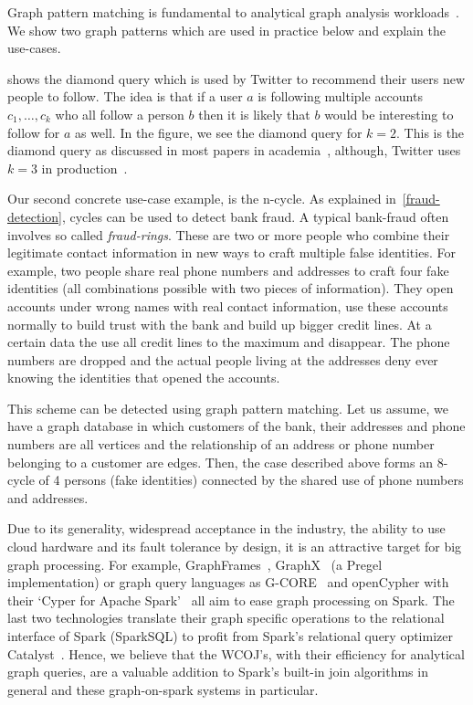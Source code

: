 Graph pattern matching is fundamental to analytical graph analysis workloads~\cite{see longbin and semih and presentation}.
We show two graph patterns which are used in practice below and explain the use-cases.

 shows the diamond query which is used by Twitter to recommend their users new people to follow.
The idea is that if a user $a$ is following multiple accounts $c_1, \dots, c_k$ who all follow a person $b$ then it is likely that
$b$ would be interesting to follow for $a$ as well.
In the figure, we see the diamond query for $k = 2$.
This is the diamond query as discussed in most papers in academia~\cite{oldog,myria-detailed,mhedhbi2019}, although,
Twitter uses $k = 3$ in production~\cite{twitter-diamond}.

Our second concrete use-case example, is the n-cycle.
As explained in~\cref{fraud-detection}, cycles can be used to detect bank fraud.
A typical bank-fraud often involves so called \textit{fraud-rings}.
These are two or more people who combine their legitimate contact information in new ways to craft multiple false identities.
For example, two people share real phone numbers and addresses to craft four fake identities (all combinations possible with two pieces
of information).
They open accounts under wrong names with real contact information, use these accounts normally to build trust with the bank and
build up bigger credit lines.
At a certain data the use all credit lines to the maximum and disappear.
The phone numbers are dropped and the actual people living at the addresses deny ever knowing the identities that opened the accounts.

This scheme can be detected using graph pattern matching.
Let us assume, we have a graph database in which customers of the bank, their addresses and phone numbers are all vertices and the
relationship of an address or phone number belonging to a customer are edges.
Then, the case described above forms an 8-cycle of 4 persons (fake identities) connected by the shared use of phone numbers and
addresses.

Due to its generality, widespread acceptance in the industry, the ability to use cloud hardware and its fault tolerance by design,
it is an attractive target for big graph processing.
For example, GraphFrames~\cite{graphframe}, GraphX~\cite{graphx} (a Pregel~\cite{pregel} implementation) or graph query languages
as \mbox{G-CORE}~\cite{gcore} and \mbox{openCypher} with their `Cyper for Apache Spark'~\cite{caps} all aim to ease graph processing on
Spark.
The last two technologies translate their graph specific operations to the relational interface of Spark (SparkSQL)
to profit from Spark's relational query optimizer Catalyst~\cite{spark-sql}.
Hence, we believe that the WCOJ's, with their efficiency for analytical graph queries, are a valuable addition to Spark's
built-in join algorithms in general and these graph-on-spark systems in particular.

